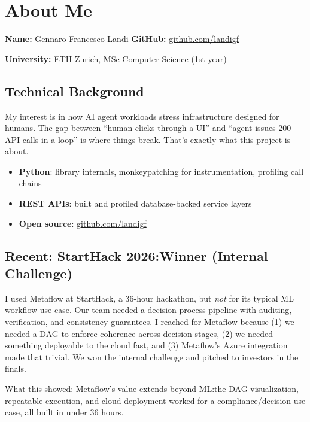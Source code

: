 \documentclass[11pt,a4paper]{article}
\begin{document}
\section{About Me}

\textbf{Name:} Gennaro Francesco Landi \hfill \textbf{GitHub:} \href{https://github.com/landigf}{github.com/landigf}

\textbf{University:} ETH Zurich, MSc Computer Science (1st year)

\subsection{Technical Background}

My interest is in how AI agent workloads stress infrastructure designed for humans. The gap between ``human clicks through a UI'' and ``agent issues 200 API calls in a loop'' is where things break. That's exactly what this project is about.

\begin{itemize}[nosep]
    \item \textbf{Python}: library internals, monkeypatching for instrumentation, profiling call chains
    \item \textbf{REST APIs}: built and profiled database-backed service layers
    \item \textbf{Open source}: \href{https://github.com/landigf}{github.com/landigf}
\end{itemize}

\subsection{Recent: StartHack 2026:Winner (Internal Challenge)}

I used Metaflow at StartHack, a 36-hour hackathon, but \textit{not} for its typical ML workflow use case. Our team needed a decision-process pipeline with auditing, verification, and consistency guarantees. I reached for Metaflow because (1) we needed a DAG to enforce coherence across decision stages, (2) we needed something deployable to the cloud fast, and (3) Metaflow's Azure integration made that trivial. We won the internal challenge and pitched to investors in the finals.

What this showed: Metaflow's value extends beyond ML:the DAG visualization, repeatable execution, and cloud deployment worked for a compliance/decision use case, all built in under 36 hours.
\end{document}
